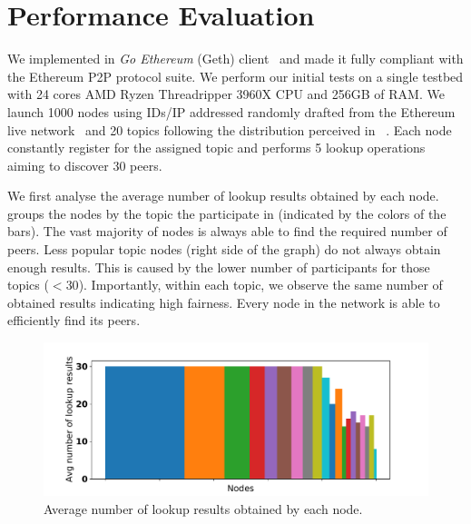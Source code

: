 
\section{Performance Evaluation}
\label{sec:eval}
 We implemented \sysname in \emph{Go Ethereum} (Geth) client~\cite{geth} and made it fully compliant with the Ethereum P2P protocol suite. We perform our initial tests on a single testbed with 
24 cores AMD Ryzen Threadripper 3960X CPU and 256GB of RAM. We launch 1000 nodes using IDs/IP addressed randomly drafted from the Ethereum live network~\cite{discv4-dns-lists} and 20 topics following the distribution perceived in ~. Each node constantly register for the assigned topic and performs 5 lookup operations aiming to discover 30 peers.

We first analyse the average number of lookup results obtained by each node.  groups the nodes by the topic the participate in (indicated by the colors of the bars). The vast majority of nodes is always able to find the required number of peers. Less popular topic nodes (right side of the graph) do not always obtain enough results. This is caused by the lower number of participants for those topics (\eg $< 30$). Importantly, within each topic, we observe the same number of obtained results indicating high fairness. Every node in the network is able to efficiently find its peers.

\begin{figure}
\centering
\includegraphics[width=\linewidth]{results/testbed/testbed_discovered_search.pdf}
\caption{Average number of lookup results obtained by each node.}
\label{fig:testbed_discovered_search}
\vspace{-0.15in}
\end{figure}

